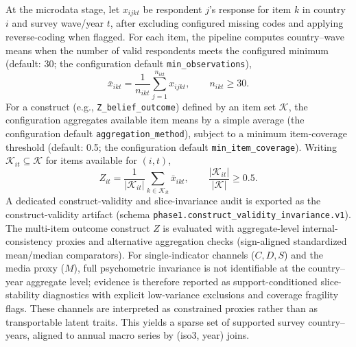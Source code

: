 \documentclass[11pt]{article}
\begin{document}
At the microdata stage, let $x_{ijkt}$ be respondent $j$'s response for item $k$ in country $i$ and survey wave/year $t$, after excluding configured missing codes and applying reverse-coding when flagged. For each item, the pipeline computes country--wave means when the number of valid respondents meets the configured minimum (default: 30; the configuration default \texttt{min\_observations}),
\begin{equation*}
\bar x_{ikt} = \frac{1}{n_{ikt}}\sum_{j=1}^{n_{ikt}} x_{ijkt},
\qquad n_{ikt}\ge 30.
\end{equation*}
For a construct (e.g., \texttt{Z\_belief\_outcome}) defined by an item set $\mathcal{K}$, the configuration aggregates available item means by a simple average (the configuration default \texttt{aggregation\_method}), subject to a minimum item-coverage threshold (default: 0.5; the configuration default \texttt{min\_item\_coverage}). Writing $\mathcal{K}_{it}\subseteq\mathcal{K}$ for items available for $(i,t)$,
\begin{equation*}
Z_{it} = \frac{1}{|\mathcal{K}_{it}|}\sum_{k\in\mathcal{K}_{it}} \bar x_{ikt},
\qquad \frac{|\mathcal{K}_{it}|}{|\mathcal{K}|}\ge 0.5.
\end{equation*}
A dedicated construct-validity and slice-invariance audit is exported as the construct-validity artifact (schema \texttt{phase1.construct\_validity\_invariance.v1}). The multi-item outcome construct $Z$ is evaluated with aggregate-level internal-consistency proxies and alternative aggregation checks (sign-aligned standardized mean/median comparators). For single-indicator channels ($C,D,S$) and the media proxy ($M$), full psychometric invariance is not identifiable at the country--year aggregate level; evidence is therefore reported as support-conditioned slice-stability diagnostics with explicit low-variance exclusions and coverage fragility flags. These channels are interpreted as constrained proxies rather than as transportable latent traits.
This yields a sparse set of supported survey country--years, aligned to annual macro series by (iso3, year) joins.
\end{document}
